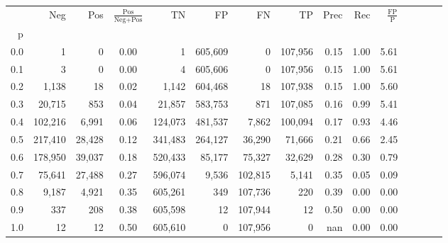 \begin{tabular}{rrrcrrrrrrrrrrr}
\toprule
{} &      Neg &     Pos & $\frac{\text{Pos}}{\text{Neg}+\text{Pos}}$ &       TN &       FP &       FN &       TP &  Prec &   Rec & $\frac{\text{FP}}{\text{P}}$ \\
p   &          &         &                                            &          &          &          &          &       &       &                              \\
\midrule
0.0 &        1 &       0 &                                       0.00 &        1 &  605,609 &        0 &  107,956 &  0.15 &  1.00 &                         5.61 \\
0.1 &        3 &       0 &                                       0.00 &        4 &  605,606 &        0 &  107,956 &  0.15 &  1.00 &                         5.61 \\
0.2 &    1,138 &      18 &                                       0.02 &    1,142 &  604,468 &       18 &  107,938 &  0.15 &  1.00 &                         5.60 \\
0.3 &   20,715 &     853 &                                       0.04 &   21,857 &  583,753 &      871 &  107,085 &  0.16 &  0.99 &                         5.41 \\
0.4 &  102,216 &   6,991 &                                       0.06 &  124,073 &  481,537 &    7,862 &  100,094 &  0.17 &  0.93 &                         4.46 \\
0.5 &  217,410 &  28,428 &                                       0.12 &  341,483 &  264,127 &   36,290 &   71,666 &  0.21 &  0.66 &                         2.45 \\
0.6 &  178,950 &  39,037 &                                       0.18 &  520,433 &   85,177 &   75,327 &   32,629 &  0.28 &  0.30 &                         0.79 \\
0.7 &   75,641 &  27,488 &                                       0.27 &  596,074 &    9,536 &  102,815 &    5,141 &  0.35 &  0.05 &                         0.09 \\
0.8 &    9,187 &   4,921 &                                       0.35 &  605,261 &      349 &  107,736 &      220 &  0.39 &  0.00 &                         0.00 \\
0.9 &      337 &     208 &                                       0.38 &  605,598 &       12 &  107,944 &       12 &  0.50 &  0.00 &                         0.00 \\
1.0 &       12 &      12 &                                       0.50 &  605,610 &        0 &  107,956 &        0 &   nan &  0.00 &                         0.00 \\
\bottomrule
\end{tabular}
